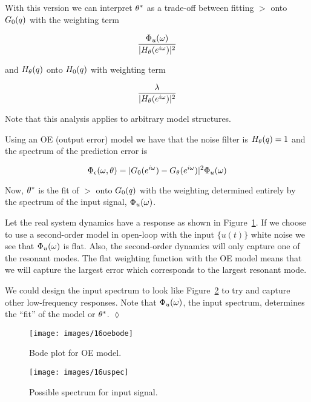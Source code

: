With this version we can interpret $\theta^\ast$ as a trade-off between fitting $\gt$ onto $G_0(q)$ with the weighting term

\begin{equation*}
\frac{\Phi_u(\omega)}{|H_\theta(e^{i\omega})|^2}
\end{equation*}

and $H_\theta(q)$ onto $H_0(q)$ with weighting term

\begin{equation*}
\frac{\lambda}{|H_\theta(e^{i\omega})|^2}
\end{equation*}

Note that this analysis applies to arbitrary model structures.

\begin{example}
Using an OE (output error) model we have that the noise filter is $H_\theta(q)=1$ and the spectrum of the prediction error is

\begin{equation*}
\Phi_\epsilon(\omega,\theta) = |G_0(e^{i\omega})-G_\theta(e^{i\omega})|^2\Phi_u(\omega)
\end{equation*}

Now, $\theta^\ast$ is the fit of $\gt$ onto $G_0(q)$ with the weighting determined entirely by the spectrum of the input signal, $\Phi_u(\omega)$.

Let the real system dynamics have a response as shown in Figure~\ref{fig:16oebode}.
If we choose to use a second-order model in open-loop with the input $\{u(t)\}$ white noise we see that $\Phi_u(\omega)$ is flat.
Also, the second-order dynamics will only capture one of the resonant modes.
The flat weighting function with the OE model means that we will capture the largest error which corresponds to the largest resonant mode.

We could design the input spectrum to look like Figure~\ref{fig:16uspec} to try and capture other low-frequency responses.
Note that $\Phi_u(\omega)$, the input spectrum, determines the ``fit'' of the model or $\theta^\ast$.
$\lozenge$
\end{example}

\begin{figure}[ht!]
\centering
\texttt{[image: images/16oebode]}
\caption{Bode plot for OE model.}%
\label{fig:16oebode}
\end{figure}

\begin{figure}[ht!]
\centering
\texttt{[image: images/16uspec]}
\caption{Possible spectrum for input signal.}%
\label{fig:16uspec}
\end{figure}

